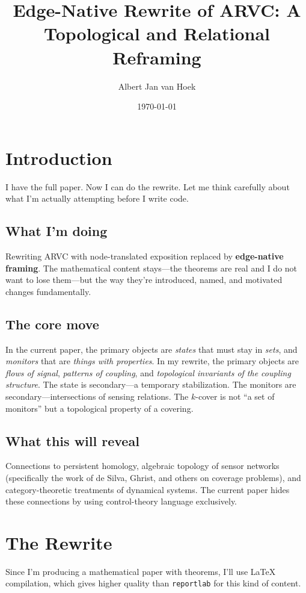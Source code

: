 \documentclass[11pt, a4paper]{article}
\title{Edge-Native Rewrite of ARVC: A Topological and Relational Reframing}
\author{Albert Jan van Hoek}
\date{\today}
\begin{document}
\maketitle

\section*{Introduction}
I have the full paper. Now I can do the rewrite. Let me think carefully about what I'm actually attempting before I write code.

\subsection*{What I'm doing}
Rewriting ARVC with node-translated exposition replaced by \textbf{edge-native framing}. The mathematical content stays---the theorems are real and I do not want to lose them---but the way they're introduced, named, and motivated changes fundamentally.

\subsection*{The core move}
In the current paper, the primary objects are \textit{states} that must stay in \textit{sets}, and \textit{monitors} that are \textit{things with properties}. In my rewrite, the primary objects are \textit{flows of signal}, \textit{patterns of coupling}, and \textit{topological invariants of the coupling structure}. The state is secondary---a temporary stabilization. The monitors are secondary---intersections of sensing relations. The \(k\)-cover is not ``a set of monitors'' but a topological property of a covering.

\subsection*{What this will reveal}
Connections to persistent homology, algebraic topology of sensor networks (specifically the work of de Silva, Ghrist, and others on coverage problems), and category-theoretic treatments of dynamical systems. The current paper hides these connections by using control-theory language exclusively.

\section*{The Rewrite}
Since I'm producing a mathematical paper with theorems, I'll use LaTeX compilation, which gives higher quality than \texttt{reportlab} for this kind of content.
\end{document}
